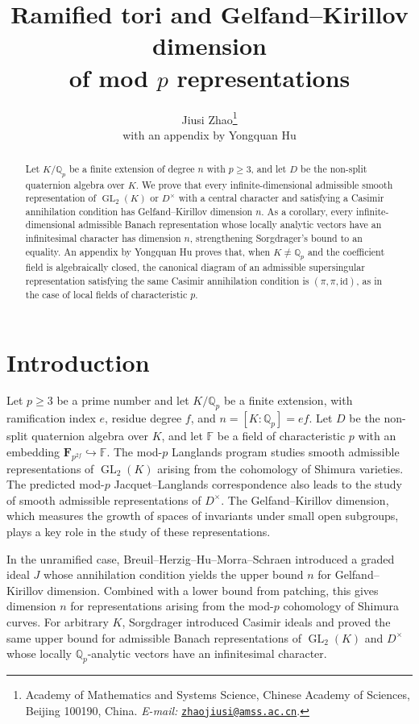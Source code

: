 \documentclass[11pt]{article}
\title{Ramified tori and Gelfand--Kirillov dimension\\
of mod $p$ representations}
\author{Jiusi Zhao\thanks{Academy of Mathematics and Systems Science,
Chinese Academy of Sciences, Beijing 100190, China.
\textit{E-mail:}
\href{mailto:zhaojiusi@amss.ac.cn}{\texttt{zhaojiusi@amss.ac.cn}}.}\\[0.4em]
\small with an appendix by Yongquan Hu}
\date{}
\numberwithin{equation}{section}
\theoremstyle{definition}
\theoremstyle{remark}
\newcommand{\F}{\mathbb F}
\newcommand{\Q}{\mathbb Q}
\DeclareMathOperator{\GL}{GL}
\begin{document}
\maketitle

\begin{abstract}
Let $K/\Q_p$ be a finite extension of degree $n$ with $p\geq3$,
and let $D$ be the non-split quaternion algebra over $K$. 
We prove that every infinite-dimensional admissible smooth
representation of $\GL_2(K)$ or $D^\times$ with a central character
and satisfying a Casimir annihilation condition has
Gelfand--Kirillov dimension $n$. As a corollary, every infinite-dimensional admissible Banach
representation whose locally analytic vectors have an infinitesimal
character has dimension $n$, strengthening Sorgdrager's bound to an
equality. An appendix by Yongquan Hu proves that, when $K\ne\Q_p$
and the coefficient field is algebraically closed, the canonical
diagram of an admissible supersingular representation satisfying
the same Casimir annihilation condition is $(\pi,\pi,\mathrm{id})$, 
as in the case of local fields of characteristic $p$.
\end{abstract}

\section{Introduction}\label{sec:introduction}

Let $p\geq3$ be a prime number and let $K/\Q_p$ be a finite
extension, with ramification index $e$, residue degree $f$, and
$n=[K:\Q_p]=ef$. Let $D$ be the non-split quaternion algebra
over $K$, and let $\F$ be a field of characteristic $p$ 
with an embedding $\mathbf F_{p^{2f}}\hookrightarrow\F$.
The mod-$p$ Langlands program studies smooth
admissible representations of $\GL_2(K)$ arising from the
cohomology of Shimura varieties. The predicted mod-$p$
Jacquet--Langlands correspondence also leads to the study of
smooth admissible representations of $D^\times$. 
The Gelfand--Kirillov dimension, which measures the growth of spaces
of invariants under small open subgroups, plays a key role in the study
of these representations.
 
In the unramified case, Breuil--Herzig--Hu--Morra--Schraen
\cite{BHH23,BHH25} introduced a graded ideal $J$ whose annihilation
condition yields the upper bound $n$ for Gelfand--Kirillov dimension.
Combined with a lower bound from patching, this gives dimension $n$
for representations arising from the mod-$p$ cohomology of
Shimura curves. For arbitrary $K$, Sorgdrager \cite{Sor26b} introduced
Casimir ideals and proved the same upper bound for
admissible Banach representations of $\GL_2(K)$ and $D^\times$
whose locally $\Q_p$-analytic vectors have an infinitesimal character.
\end{document}
